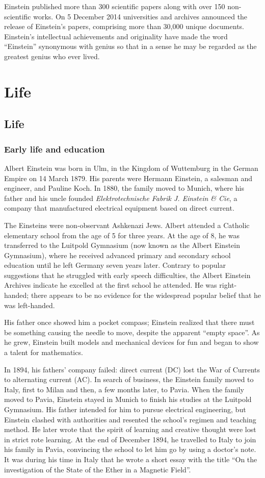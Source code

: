 \documentclass[twoside]{report}
\begin{document}
Einstein published more than 300 scientific papers along with over
150 non-scientific works. On 5 December 2014 universities and
archives announced the release of Einstein's papers, comprising more
than 30,000 unique documents. Einstein's intellectual achievements and
originality have made the word ``Einstein'' synonymous with genius so
that in a sense he may be regarded as the greatest genius who ever lived.

\chapter{Life}
\section{Life}
\subsection{Early life and education}

Albert Einstein was born in Ulm, in the Kingdom of Wuttemburg in
the German Empire on 14 March 1879. His parents were Hermann Einstein,
a salesman and engineer, and Pauline Koch. In 1880, the family moved
to Munich, where his father and his uncle founded
\emph{Elektrotechnische Fabrik J. Einstein \& Cie}, a company that
manufactured electrical equipment based on direct current.

The Einsteins were non-observant Ashkenazi Jews. Albert attended a
Catholic elementary school from the age of 5 for three years. At the
age of 8, he was transferred to the Luitpold Gymnasium (now known as
the Albert Einstein Gymnasium), where he received advanced primary and
secondary school education until he left Germany seven years later.
Contrary to popular suggestions that he struggled with early speech
difficulties, the Albert Einstein Archives indicate he excelled at
the first school he attended. He was right-handed; there appears to
be no evidence for the widespread popular belief that he was left-handed.

His father once showed him a pocket compass; Einstein realized that
there must be something causing the needle to move, despite the apparent
``empty space''. As he grew, Einstein built models and mechanical devices
for fun and began to show a talent for mathematics.

In 1894, his fathers' company failed: direct current (DC) lost the War of
Currents to alternating current (AC). In search of business, the Einstein
family moved to Italy, first to Milan and then, a few months later, to Pavia.
When the family moved to Pavia, Einstein stayed in Munich to finish his
studies at the Luitpold Gymnasium. His father intended for him to pursue
electrical engineering, but Einstein clashed with authorities and resented
the school's regimen and teaching method. He later wrote that the spirit of
learning and creative thought were lost in strict rote learning. At the end
of December 1894, he travelled to Italy to join his family in Pavia,
convincing the school to let him go by using a doctor's note. It was during
his time in Italy that he wrote a short essay with the title ``On the
investigation of the State of the Ether in a Magnetic Field''.
\end{document}
